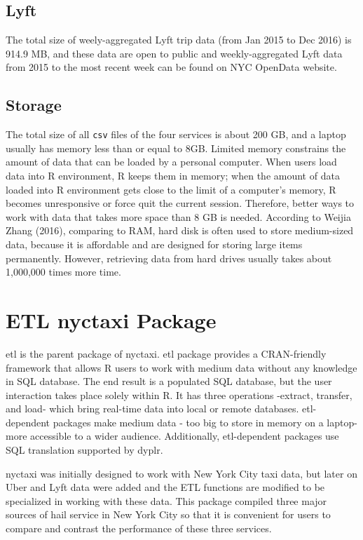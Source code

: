 \documentclass[12pt,twoside]{reedthesis}
\theoremstyle{definition}
\theoremstyle{definition}
\theoremstyle{definition}
\theoremstyle{remark}
\begin{document}
\subsection{Lyft}\label{lyft-1}

The total size of weely-aggregated Lyft trip data (from Jan 2015 to Dec
2016) is 914.9 MB, and these data are open to public and
weekly-aggregated Lyft data from 2015 to the most recent week can be
found on NYC OpenData website.

\subsection{Storage}\label{storage}

The total size of all \texttt{csv} files of the four services is about
200 GB, and a laptop usually has memory less than or equal to 8GB.
Limited memory constrains the amount of data that can be loaded by a
personal computer. When users load data into R environment, R keeps them
in memory; when the amount of data loaded into R environment gets close
to the limit of a computer's memory, R becomes unresponsive or force
quit the current session. Therefore, better ways to work with data that
takes more space than 8 GB is needed. According to Weijia Zhang (2016),
comparing to RAM, hard disk is often used to store medium-sized data,
because it is affordable and are designed for storing large items
permanently. However, retrieving data from hard drives usually takes
about 1,000,000 times more time.

\section{ETL nyctaxi Package}\label{etl-nyctaxi-package}

etl is the parent package of nyctaxi. etl package provides a
CRAN-friendly framework that allows R users to work with medium data
without any knowledge in SQL database. The end result is a populated SQL
database, but the user interaction takes place solely within R. It has
three operations -extract, transfer, and load- which bring real-time
data into local or remote databases. etl-dependent packages make medium
data - too big to store in memory on a laptop- more accessible to a
wider audience. Additionally, etl-dependent packages use SQL translation
supported by dyplr.

nyctaxi was initially designed to work with New York City taxi data, but
later on Uber and Lyft data were added and the ETL functions are
modified to be specialized in working with these data. This package
compiled three major sources of hail service in New York City so that it
is convenient for users to compare and contrast the performance of these
three services.
\end{document}
